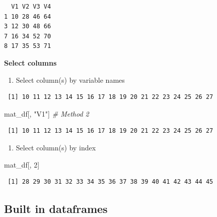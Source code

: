 \documentclass[
]{book}
\newenvironment{Shaded}{\begin{snugshade}}{\end{snugshade}}
\newcommand{\CommentTok}[1]{\textcolor[rgb]{0.56,0.35,0.01}{\textit{#1}}}
\newcommand{\DecValTok}[1]{\textcolor[rgb]{0.00,0.00,0.81}{#1}}
\newcommand{\NormalTok}[1]{#1}
\newcommand{\OperatorTok}[1]{\textcolor[rgb]{0.81,0.36,0.00}{\textbf{#1}}}
\newcommand{\StringTok}[1]{\textcolor[rgb]{0.31,0.60,0.02}{#1}}
\providecommand{\tightlist}{%
  \setlength{\itemsep}{0pt}\setlength{\parskip}{0pt}}
\begin{document}
\begin{verbatim}
  V1 V2 V3 V4
1 10 28 46 64
3 12 30 48 66
7 16 34 52 70
8 17 35 53 71
\end{verbatim}

\textbf{Select columns}

\begin{enumerate}
\def\labelenumi{\arabic{enumi}.}
\tightlist
\item
  Select column(s) by variable names
\end{enumerate}

\begin{Shaded}
\end{Shaded}

\begin{verbatim}
 [1] 10 11 12 13 14 15 16 17 18 19 20 21 22 23 24 25 26 27
\end{verbatim}

\begin{Shaded}
\begin{Highlighting}[]
\NormalTok{mat_df[, }\StringTok{"V1"}\NormalTok{] }\CommentTok{# Method 2}
\end{Highlighting}
\end{Shaded}

\begin{verbatim}
 [1] 10 11 12 13 14 15 16 17 18 19 20 21 22 23 24 25 26 27
\end{verbatim}

\begin{enumerate}
\def\labelenumi{\arabic{enumi}.}
\setcounter{enumi}{1}
\tightlist
\item
  Select column(s) by index
\end{enumerate}

\begin{Shaded}
\begin{Highlighting}[]
\NormalTok{mat_df[, }\DecValTok{2}\NormalTok{]}
\end{Highlighting}
\end{Shaded}

\begin{verbatim}
 [1] 28 29 30 31 32 33 34 35 36 37 38 39 40 41 42 43 44 45
\end{verbatim}

\hypertarget{built-in-dataframes}{%
\subsection{Built in dataframes}\label{built-in-dataframes}}
\end{document}

